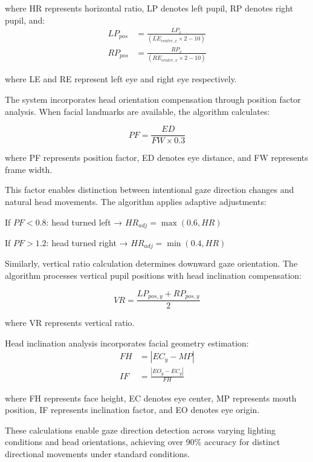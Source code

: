 \documentclass[conference]{IEEEtran}
\begin{document}
where HR represents horizontal ratio, LP denotes left pupil, RP denotes right pupil, and:
\begin{align}
LP_{pos} &= \frac{LP_x}{(LE_{center,x} \times 2 - 10)} \\
RP_{pos} &= \frac{RP_x}{(RE_{center,x} \times 2 - 10)}
\end{align}

where LE and RE represent left eye and right eye respectively.

The system incorporates head orientation compensation through position factor analysis. 
When facial landmarks are available, the algorithm calculates:

\begin{equation}
PF = \frac{ED}{FW \times 0.3}
\end{equation}

where PF represents position factor, ED denotes eye distance, and FW represents frame width.

This factor enables distinction between intentional gaze direction changes and natural 
head movements. The algorithm applies adaptive adjustments:

If $PF < 0.8$: head turned left → $HR_{adj} = \max(0.6, HR)$  

If $PF > 1.2$: head turned right → $HR_{adj} = \min(0.4, HR)$

Similarly, vertical ratio calculation determines downward gaze orientation. The algorithm 
processes vertical pupil positions with head inclination compensation:

\begin{equation}
VR = \frac{LP_{pos,y} + RP_{pos,y}}{2}
\end{equation}

where VR represents vertical ratio.

Head inclination analysis incorporates facial geometry estimation:
\begin{align}
FH &= |EC_y - MP| \\
IF &= \frac{|EO_y - EC_y|}{FH}
\end{align}

where FH represents face height, EC denotes eye center, MP represents mouth position, 
IF represents inclination factor, and EO denotes eye origin.

These calculations enable gaze direction detection across varying lighting conditions 
and head orientations, achieving over 90\% accuracy for distinct directional movements 
under standard conditions.
\end{document}
